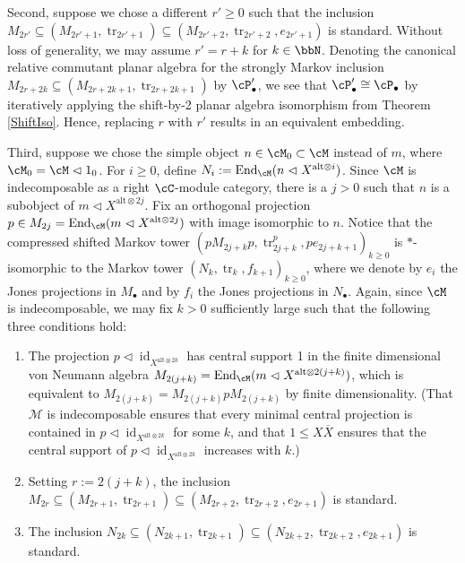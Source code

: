 \documentclass[11pt]{article}
\theoremstyle{plain}
\theoremstyle{definition}
\DeclareMathOperator{\End}{End}
\DeclareMathOperator{\id}{id}
\DeclareMathOperator{\tr}{tr}
\begin{document}
Second, suppose we chose a different $r'\geq 0$ such that the inclusion $M_{2r'}\subseteq (M_{2r'+1}, \tr_{2r'+1})\subseteq (M_{2r'+2}, \tr_{2r'+2}, e_{2r'+1})$ is standard.
Without loss of generality, we may assume $r' = r+k$ for $k\in \bbN$.
Denoting the canonical relative commutant planar algebra for the strongly Markov inclusion $M_{2r+2k}\subseteq (M_{2r+2k+1}, \tr_{2r+2k+1})$ by $\cP_\bullet'$, we see that $\cP_\bullet'\cong \cP_\bullet$ by iteratively applying the shift-by-2 planar algebra isomorphism from Theorem \ref{ShiftIso}. 
Hence, replacing $r$ with $r'$ results in an equivalent embedding.

Third, suppose we chose the simple object $n\in \cM_0 \subset \cM$ instead of $m$, where $\cM_0 = \cM\vartriangleleft 1_0$.
For $i\geq 0$, define $N_i := \End_\cM(n \vartriangleleft X^{\text{alt}\otimes i})$.
Since $\cM$ is indecomposable as a right $\cC$-module category, there is a $j>0$ such that $n$ is a subobject of $m \vartriangleleft X^{\text{alt}\otimes 2j}$.
Fix an orthogonal projection $p \in M_{2j} = \End_\cM(m \vartriangleleft X^{\text{alt}\otimes 2j})$ with image isomorphic to $n$.
Notice that the compressed shifted Markov tower $(pM_{2j+k}p, \tr_{2j+k}^p, pe_{2j+k+1})_{k\geq 0}$ is $*$-isomorphic to the Markov tower $(N_{k}, \tr_k, f_{k+1})_{k\geq 0}$, where we denote by $e_i$ the Jones projections in $M_\bullet $ and by $f_i$ the Jones projections in $N_\bullet$.
Again, since $\cM$ is indecomposable, we may fix $k>0$ sufficiently large such that the following three conditions hold:
\begin{enumerate}[label={\rm(\arabic*)}]
\item
 The projection $p\vartriangleleft \id_{X^{\text{alt}\otimes 2k}}$ has central support 1 in the finite dimensional von Neumann algebra $M_{2(j+k)} = \End_\cM(m \vartriangleleft X^{\text{alt}\otimes 2(j+k)})$, which is equivalent to $M_{2(j+k)} = M_{2(j+k)}p M_{2(j+k)}$ by finite dimensionality.
  (That $\mathcal{M}$ is indecomposable ensures that every minimal central projection is contained in $p\vartriangleleft\id_{X^{\text{alt}\otimes 2k}}$ for some $k$, and that $1\le X\overline{X}$ ensures that the central support of $p\vartriangleleft\id_{X^{\text{alt}\otimes 2k}}$ increases with $k$.)
\item
Setting $r:= 2(j+k)$, the inclusion $M_{2r} \subseteq (M_{2r+1}, \tr_{2r+1}) \subseteq (M_{2r+2}, \tr_{2r+2}, e_{2r+1})$ is standard.
\item
The inclusion $N_{2k} \subseteq (N_{2k+1}, \tr_{2k+1}) \subseteq (N_{2k+2}, \tr_{2k+2}, e_{2k+1})$ is standard.
\end{enumerate}
\end{document}
